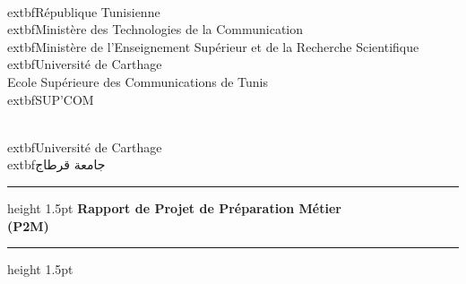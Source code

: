 \documentclass[12pt,a4paper]{article}
\begin{document}
\begin{titlepage}
    \thispagestyle{empty}
    \begin{center}
        \begin{minipage}[t]{0.45\textwidth}
            \begin{center}
                \\[0.2cm]
                	extbf{\small République Tunisienne}\\[0.1cm]
                	extbf{\scriptsize Ministère des Technologies de la Communication}\\[0.1cm]
                	extbf{\tiny Ministère de l'Enseignement Supérieur et de la Recherche Scientifique}\\[0.2cm]
                	extbf{\small Université de Carthage}\\[0.1cm]
                {\small Ecole Supérieure des Communications de Tunis}\\[0.1cm]
                	extbf{\large SUP'COM}
            \end{center}
        \end{minipage}
        \hfill
        \begin{minipage}[t]{0.45\textwidth}
            \begin{center}
                \\[0.2cm]
                	extbf{\small Université de Carthage}\\[0.1cm]
                	extbf{\small جامعة قرطاج}
            \end{center}
        \end{minipage}
        
        \vfill
        \vspace{1cm}
        
        \strut\hrule height 1.5pt
        \vspace{0.4cm}
        {\Large \textbf{Rapport de Projet de Préparation Métier \\ (P2M)}}
        \vspace{0.4cm}
        \hrule height 1.5pt
        
        \vfill
        \vspace{1cm}
        

\end{center}
\end{titlepage}
\end{document}
